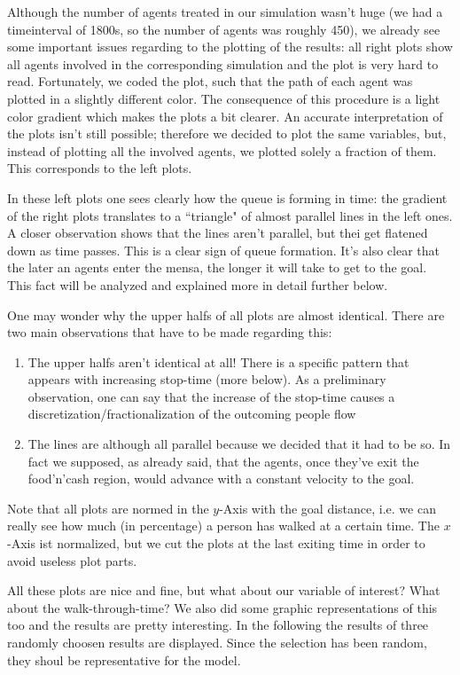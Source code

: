 \documentclass[11pt]{article}
\begin{document}
Although the number of agents treated in our simulation wasn't huge (we had a timeinterval of 1800s, so the number of agents was roughly 450), we already see some important issues regarding to the plotting of the results: all right plots show all agents involved in the corresponding simulation and the plot is very hard to read. Fortunately, we coded the plot, such that the path of each agent was plotted in a slightly different color. The consequence of this procedure is a light color gradient which makes the plots a bit clearer.
An accurate interpretation of the plots isn't still possible; therefore we decided to plot the same variables, but, instead of plotting all the involved agents, we plotted solely a fraction of them. This corresponds to the left plots.

In these left plots one sees clearly how the queue is forming in time: the gradient of the right plots translates to a ``triangle" of almost parallel lines in the left ones. A closer observation shows that the lines aren't parallel, but thei get flatened down as time passes. This is a clear sign of queue formation. It's also clear that the later an agents enter the mensa, the longer it will take to get to the goal. This fact will be analyzed and explained more in detail further below.

One may wonder why the upper halfs of all plots are almost identical. There are two main observations that have to be made regarding this:
\begin{enumerate}
	\item The upper halfs aren't identical at all! There is a specific pattern that appears with increasing stop-time (more below). As a preliminary observation, one can say that the increase of the stop-time causes a discretization/fractionalization of the outcoming people flow
	\item The lines are although all parallel because we decided that it had to be so. In fact we supposed, as already said, that the agents, once they've exit the food'n'cash region, would advance with a constant velocity to the goal.
\end{enumerate}

Note that all plots are normed in the $y$-Axis with the goal distance, i.e. we can really see how much (in percentage) a person has walked at a certain time. The $x$-Axis ist normalized, but we cut the plots at the last exiting time in order to avoid useless plot parts.

All these plots are nice and fine, but what about our variable of interest? What about the walk-through-time? We also did some graphic representations of this too and the results are pretty interesting. In the following the results of three randomly choosen results are displayed. Since the selection has been random, they shoul be representative for the model.
\end{document}
